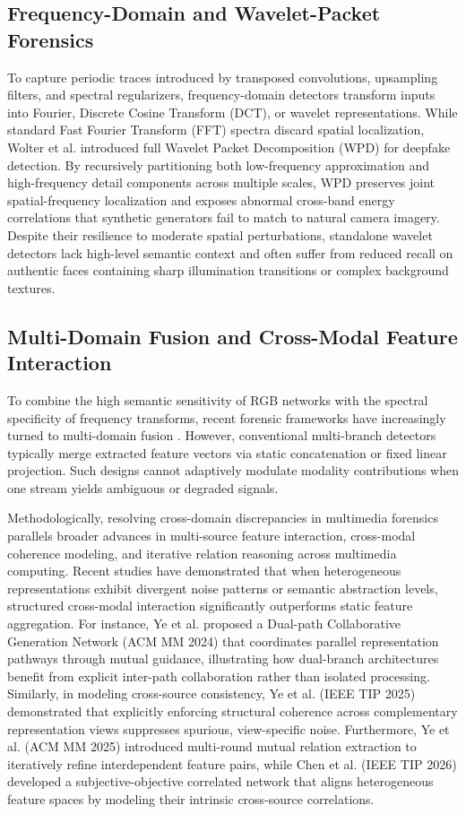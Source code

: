 \documentclass[fleqn,10pt]{wlscirep}
\begin{document}
\subsection*{Frequency-Domain and Wavelet-Packet Forensics}
To capture periodic traces introduced by transposed convolutions, upsampling filters, and spectral regularizers, frequency-domain detectors transform inputs into Fourier, Discrete Cosine Transform (DCT), or wavelet representations. While standard Fast Fourier Transform (FFT) spectra discard spatial localization, Wolter et al. \cite{ref8} introduced full Wavelet Packet Decomposition (WPD) for deepfake detection. By recursively partitioning both low-frequency approximation and high-frequency detail components across multiple scales, WPD preserves joint spatial-frequency localization and exposes abnormal cross-band energy correlations that synthetic generators fail to match to natural camera imagery. Despite their resilience to moderate spatial perturbations, standalone wavelet detectors lack high-level semantic context and often suffer from reduced recall on authentic faces containing sharp illumination transitions or complex background textures.

\subsection*{Multi-Domain Fusion and Cross-Modal Feature Interaction}
To combine the high semantic sensitivity of RGB networks with the spectral specificity of frequency transforms, recent forensic frameworks have increasingly turned to multi-domain fusion \cite{ref6, ref7}. However, conventional multi-branch detectors typically merge extracted feature vectors via static concatenation or fixed linear projection. Such designs cannot adaptively modulate modality contributions when one stream yields ambiguous or degraded signals.

Methodologically, resolving cross-domain discrepancies in multimedia forensics parallels broader advances in multi-source feature interaction, cross-modal coherence modeling, and iterative relation reasoning across multimedia computing. Recent studies have demonstrated that when heterogeneous representations exhibit divergent noise patterns or semantic abstraction levels, structured cross-modal interaction significantly outperforms static feature aggregation. For instance, Ye et al. \cite{ref32} proposed a Dual-path Collaborative Generation Network (ACM MM 2024) that coordinates parallel representation pathways through mutual guidance, illustrating how dual-branch architectures benefit from explicit inter-path collaboration rather than isolated processing. Similarly, in modeling cross-source consistency, Ye et al. \cite{ref33} (IEEE TIP 2025) demonstrated that explicitly enforcing structural coherence across complementary representation views suppresses spurious, view-specific noise. Furthermore, Ye et al. \cite{ref34} (ACM MM 2025) introduced multi-round mutual relation extraction to iteratively refine interdependent feature pairs, while Chen et al. \cite{ref35} (IEEE TIP 2026) developed a subjective-objective correlated network that aligns heterogeneous feature spaces by modeling their intrinsic cross-source correlations.
\end{document}
